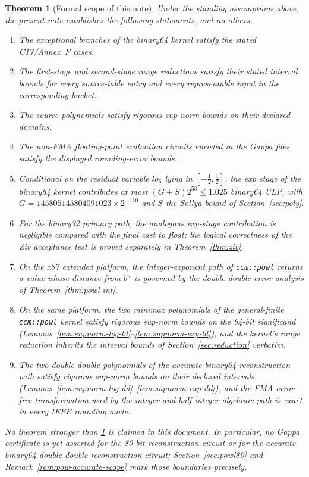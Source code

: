 \documentclass[11pt]{article}
\theoremstyle{plain}
\newtheorem{theorem}{Theorem}
\theoremstyle{remark}
\newcommand{\Powl}{\texttt{ccm::powl}}
\newcommand{\Gdbl}{145805145804091023 \times 2^{-110}}
\begin{document}
\begin{theorem}[Formal scope of this note]
\label{thm:scope}
Under the standing assumptions above, the present note establishes the
following statements, and no others.
\begin{enumerate}[label=(S\arabic*)]
  \item The exceptional branches of the binary64 kernel satisfy the stated
    C17/Annex~F cases.
  \item The first-stage and second-stage range reductions satisfy their stated
    interval bounds for every source-table entry and every representable input
    in the corresponding bucket.
  \item The source polynomials satisfy rigorous sup-norm bounds on their
    declared domains.
  \item The non-FMA floating-point evaluation circuits encoded in the Gappa
    files satisfy the displayed rounding-error bounds.
  \item Conditional on the residual variable $lo_6$ lying in
    $[-\tfrac12,\tfrac12]$, the exp stage of the binary64 kernel contributes
    at most $(G+S)2^{53} \le 1.025$ binary64 ULP, with $G=\Gdbl$ and $S$ the
    Sollya bound of Section~\ref{sec:poly}.
  \item For the binary32 primary path, the analogous exp-stage contribution is
    negligible compared with the final cast to float; the logical correctness
    of the Ziv acceptance test is proved separately in
    Theorem~\ref{thm:ziv}.
  \item On the x87 extended platform, the integer-exponent path of \Powl{}
    returns a value whose distance from $b^{n}$ is governed by the
    double-double error analysis of Theorem~\ref{thm:powl-int}.
  \item On the same platform, the two minimax polynomials of the general-finite
    \Powl{} kernel satisfy rigorous sup-norm bounds on the 64-bit significand
    (Lemmas~\ref{lem:supnorm-log-ld}--\ref{lem:supnorm-exp-ld}), and the
    kernel's range reduction inherits the interval bounds of
    Section~\ref{sec:reduction} verbatim.
  \item The two double-double polynomials of the accurate binary64
    reconstruction path satisfy rigorous sup-norm bounds on their declared
    intervals (Lemmas~\ref{lem:supnorm-log-dd}--\ref{lem:supnorm-exp-dd}), and
    the FMA error-free transformation used by the integer and half-integer
    algebraic path is exact in every IEEE rounding mode.
\end{enumerate}
No theorem stronger than \ref{thm:scope} is claimed in this document.  In
particular, no Gappa certificate is yet asserted for the 80-bit reconstruction
circuit or for the accurate binary64 double-double reconstruction circuit;
Section~\ref{sec:powl80} and Remark~\ref{rem:pow-accurate-scope} mark those
boundaries precisely.
\end{theorem}
\end{document}
